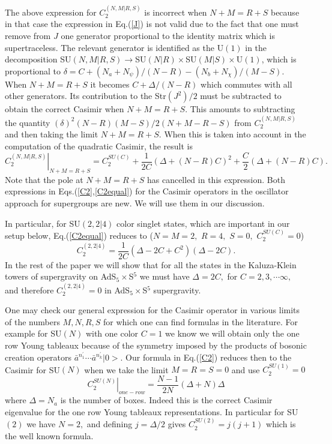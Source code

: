 \documentclass[a4paper,aps,preprint,nofootinbib]{revtex4}
\begin{document}
The above expression for $C_{2}^{\left( N,M|R,S\right) }$ is
incorrect when $N+M=R+S$ because in that case the expression in
Eq.(\ref{J}) is not valid due to the fact that one must remove
from $J$ one generator proportional to the identity matrix which
is supertraceless. The relevant generator is identified as the
U$(1)$ in the decomposition
SU$(N,M|R,S)\rightarrow$SU$(N|R)\times$SU$(M|S)\times$U$(1)$,
which is proportional to
$\delta=C+(N_a+N_\psi)/(N-R)-(N_b+N_\chi)/(M-S)$. When $N+M=R+S$
it becomes $C+\Delta/(N-R)$ which commutes with all other
generators. Its contribution to the Str$(J^2)/2$ must be
subtracted to obtain the correct Casimir when $N+M=R+S$. This
amounts to subtracting the quantity
$(\delta)^2(N-R)(M-S)/2(N+M-R-S)$ from
$C_{2}^{\left(N,M|R,S\right) }$ and then taking the limit
$N+M=R+S$. When this is taken into account in the computation of
the quadratic Casimir, the result is
\begin{equation}
\left. C_{2}^{\left( N,M|R,S\right) }\right\vert _{N+M=R+S}=C_{2}^{SU\left(
C\right) }+\frac{1}{2C}\left( \Delta+\left( N-R\right) C\right) ^{2}+\frac{C
}{2}\left( \Delta+\left( N-R\right) C\right) .  \label{C2equal}
\end{equation}
Note that the pole at $N+M=R+S$ has cancelled in this expression.
Both expressions in Eqs.(\ref{C2},\ref{C2equal}) for the Casimir
operators in the oscillator approach for supergroups are new. We
will use them in our discussion.

In particular, for SU$\left( 2,2|4\right) $ color singlet states, which are
important in our setup below, Eq.(\ref{C2equal}) reduces to ($N=M=2,$ $R=4,$
$S=0,$ $C_{2}^{SU\left( C\right) }=0$)
\begin{equation}
C_{2}^{\left( 2,2|4\right) }=\frac{1}{2C}\left( \Delta-2C+C^{2}\right)
\left( \Delta-2C\right) .  \label{colorless}
\end{equation}
In the rest of the paper we will show that for all the states in
the Kaluza-Klein towers of supergravity on AdS$_{5}\times$S$^{5}$
we must have $\Delta=2C,$ for $C=2,3,\cdots\infty,$ and therefore
$C_{2}^{\left( 2,2|4\right) }=0$ in AdS$_{5}\times$S$^{5}$
supergravity.

One may check our general expression for the Casimir operator in
various limits of the numbers $M,N,R,S$ for which one can find
formulas in the literature. For example for SU$\left( N\right) $
with one color $C=1$ we know we will obtain only the one row Young
tableaux because of the symmetry imposed by the products of
bosonic creation operators $\bar{a}^{n_{1}^{\prime
}}\cdots\bar{a}^{n_{k}^{\prime}}|0>$. Our formula in Eq.(\ref{C2})
reduces then to the Casimir for SU$\left( N\right) $ when we take
the limit $M=R=S=0$ and use $C_{2}^{SU\left( 1\right) }=0$
\begin{equation}
\left. C_{2}^{SU\left( N\right) }\right\vert _{one-row}=\frac{N-1}{2N}
\left( \Delta+N\right) \Delta
\end{equation}
where $\Delta=N_{a}$ is the number of boxes. Indeed this is the correct
Casimir eigenvalue for the one row Young tableaux representations. In
particular for SU$\left( 2\right) $ we have $N=2,$ and defining $j=\Delta/2$
gives $C_{2}^{SU\left( 2\right) }=j\left( j+1\right) $ which is the well
known formula.
\end{document}
